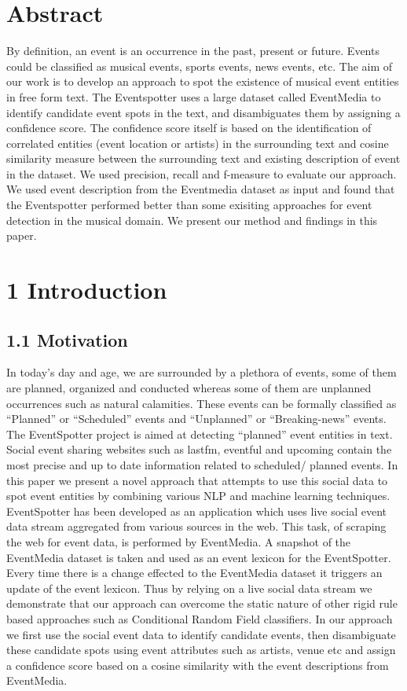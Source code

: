 \documentclass[a4paper,11pt]{report}
\begin{document}
\chapter*{Abstract}
By definition, an event is an occurrence in the past, present or future. Events could be classified as musical events, sports events, news events, etc. The aim of our work is to develop an approach to spot the existence of musical event entities in free form text. The Eventspotter uses a large dataset called EventMedia to identify candidate event spots in the text, and disambiguates them by assigning a confidence score. The confidence score itself is based on the identification of correlated entities (event location or artists) in the surrounding text and cosine similarity measure between the surrounding text and existing description of event in the dataset. We used precision, recall and f-measure to evaluate our approach. We used event description from the Eventmedia dataset as input and found that the Eventspotter performed better than some exisiting approaches for event detection in the musical domain. We present our method and findings in this paper.

\chapter*{1 Introduction}
\section*{1.1 Motivation}
In today’s day and age, we are surrounded by a plethora of events, some of them are planned, organized and conducted whereas some of them are unplanned occurrences such as natural calamities. These events can be formally classified as ``Planned'' or ``Scheduled'' events and ``Unplanned'' or ``Breaking-news'' events. The EventSpotter project is aimed at detecting ``planned'' event entities in text. Social event sharing websites such as lastfm, eventful and upcoming contain the most precise and up to date information related to scheduled/ planned events. In this paper we present a novel approach that attempts to use this social data to spot event entities by combining various NLP and machine learning techniques. EventSpotter has been developed as an application which uses live social event data stream aggregated from various sources in the web. This task, of scraping the web for event data, is performed by EventMedia\cite{EURECOM+3865}. A snapshot of the EventMedia dataset is taken and used as an event lexicon for the EventSpotter. Every time there is a change effected to the EventMedia dataset it triggers an update of the event lexicon. Thus by relying on a live social data stream we demonstrate that our approach can overcome the static nature of other rigid rule based approaches such as Conditional Random Field classifiers. In our approach we first use the social event data to identify candidate events, then disambiguate these candidate spots using event attributes such as artists, venue etc and assign a confidence score based on a cosine similarity with the event descriptions from EventMedia. 
\end{document}
